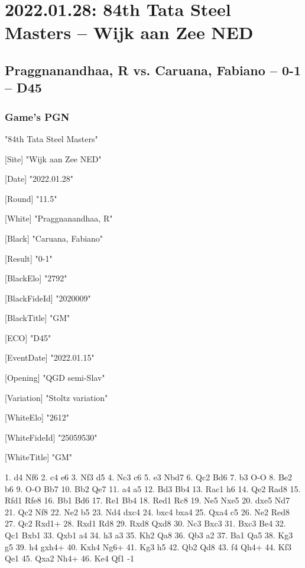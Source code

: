 \documentclass[9pt]{extarticle}
\begin{document}
\section*{2022.01.28: 84th Tata Steel Masters -- Wijk aan Zee NED}

\subsection*{Praggnanandhaa, R vs. Caruana, Fabiano -- 0-1 -- D45}
\subsubsection*{Game's PGN}
\begin{flushleft}
[Event] "84th Tata Steel Masters"

[Site] "Wijk aan Zee NED"

[Date] "2022.01.28"

[Round] "11.5"

[White] "Praggnanandhaa, R"

[Black] "Caruana, Fabiano"

[Result] "0-1"

[BlackElo] "2792"

[BlackFideId] "2020009"

[BlackTitle] "GM"

[ECO] "D45"

[EventDate] "2022.01.15"

[Opening] "QGD semi-Slav"

[Variation] "Stoltz variation"

[WhiteElo] "2612"

[WhiteFideId] "25059530"

[WhiteTitle] "GM"

\end{flushleft}
\begin{flushleft}
1. d4 Nf6 2. c4 e6 3. Nf3 d5 4. Nc3 c6 5. e3 Nbd7 6. Qc2 Bd6 7. b3 O-O 8. Be2 b6 9. O-O Bb7 10. Bb2 Qe7 11. a4 a5 12. Bd3 Bb4 13. Rac1 h6 14. Qe2 Rad8 15. Rfd1 Rfe8 16. Bb1 Bd6 17. Re1 Bb4 18. Red1 Rc8 19. Ne5 Nxe5 20. dxe5 Nd7 21. Qc2 Nf8 22. Ne2 b5 23. Nd4 dxc4 24. bxc4 bxa4 25. Qxa4 c5 26. Ne2 Red8 27. Qc2 Rxd1+ 28. Rxd1 Rd8 29. Rxd8 Qxd8 30. Nc3 Bxc3 31. Bxc3 Be4 32. Qc1 Bxb1 33. Qxb1 a4 34. h3 a3 35. Kh2 Qa8 36. Qb3 a2 37. Ba1 Qa5 38. Kg3 g5 39. h4 gxh4+ 40. Kxh4 Ng6+ 41. Kg3 h5 42. Qb2 Qd8 43. f4 Qh4+ 44. Kf3 Qe1 45. Qxa2 Nh4+ 46. Ke4 Qf1 \quad  {}-1
\end{flushleft}
\parindent 0mm
\end{document}
